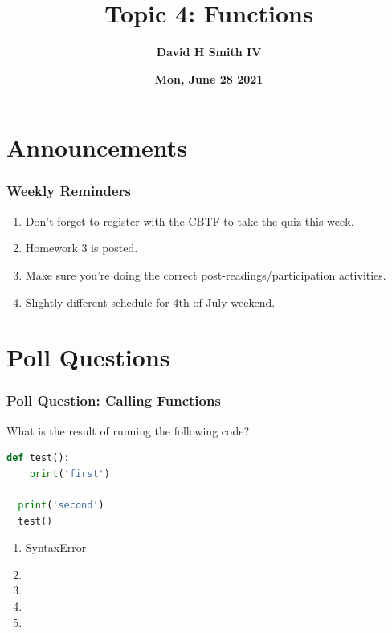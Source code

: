 \documentclass{beamer}
\title{\textbf{Topic 4: Functions}}
\author{\textbf{David H Smith IV}}
\institute[\textbf{UIUC}]{\textbf{University of Illinois Urbana-Champaign}}
\date{\textbf{Mon, June 28 2021}}
\begin{document}
\frame{\titlepage}

\section{Announcements}

%
%
\begin{frame}
  \frametitle{Weekly Reminders}
  \begin{enumerate}[A]
    \item Don't forget to register with the CBTF to take the quiz this week.
    \item Homework 3 is posted.
    \item Make sure you're doing the correct post-readings/participation activities.
    \item Slightly different schedule for 4th of July weekend.
  \end{enumerate}
\end{frame}


\section{Poll Questions}
%
%
\begin{frame}[fragile]
  \frametitle{Poll Question: Calling Functions}
  What is the result of running the following code?
  \begin{lstlisting}[language=Python, autogobble]
  def test():
    print('first')

  print('second')
  test()
  \end{lstlisting}
  \vfill
  \begin{enumerate}[A]
    \item SyntaxError
    \item {}
    \item {}
    \item {}
    \item {} %
  \end{enumerate}
\end{frame}
\end{document}
